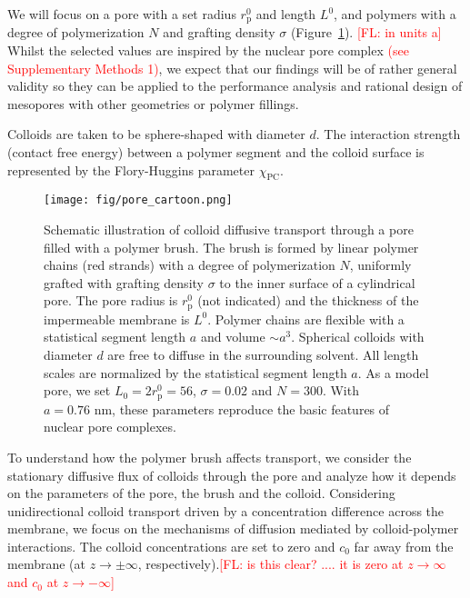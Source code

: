 \documentclass[12pt, a4paper]{article}
\newcommand\todo[1]{\textcolor{red}{#1}}
\begin{document}
We will focus on a pore with a set radius $r_{\text{p}}^0$ and length $L^0$, and polymers with a degree of polymerization $N$ and grafting density $\sigma$ (Figure~\ref{fig:colloid_transport}). \todo{[FL: in units a]}
Whilst the selected values are inspired by the nuclear pore complex \todo{(see Supplementary Methods 1)}, we expect that our findings will be of rather general validity so they can be applied to the performance analysis and rational design of mesopores with other geometries or polymer fillings.

Colloids are taken to be sphere-shaped with diameter $d$.
The interaction strength (contact free energy) between a polymer segment and the colloid surface is represented by the Flory-Huggins parameter $\chi_{\text{PC}}$.

\begin{figure}
    \centering
    \texttt{[image: fig/pore\_cartoon.png]}
    \caption{
        Schematic illustration of colloid diffusive transport through a pore filled with a polymer brush. 
        The brush is formed by linear polymer chains (red strands) with a degree of polymerization $N$, uniformly grafted with grafting density $\sigma$ 
        to the inner surface of a cylindrical pore.
        The pore radius is $r_{\text{p}}^0$ (not indicated) and the thickness of the impermeable membrane is $L^0$.
        Polymer chains are flexible with a statistical segment length $a$ and volume $\sim a^3$. 
        Spherical colloids with diameter $d$ are free to diffuse in the surrounding solvent.
        All length scales are normalized by the statistical segment length $a$.
        As a model pore, we set $L_0 = 2r_{\text{p}}^0 = 56$, $\sigma = 0.02$ and $N = 300$.
        With $a = 0.76 {\text{ nm}}$, these parameters reproduce the basic features of nuclear pore complexes.
        }
    \label{fig:colloid_transport}
\end{figure}

To understand how the polymer brush affects transport, we consider the stationary diffusive flux of colloids through the pore and analyze how it depends on the parameters of the pore, the brush and the colloid.
Considering unidirectional colloid transport driven by a concentration difference across the membrane, we focus on the mechanisms of diffusion mediated by colloid-polymer interactions.
The colloid concentrations are set to zero and $c_0$ far away from the membrane (at $z\rightarrow\pm\infty$, respectively).\todo{[FL: is this clear? .... it is zero at $z \to \infty$ and $c_0$ at $z \to -\infty$]}
\end{document}
